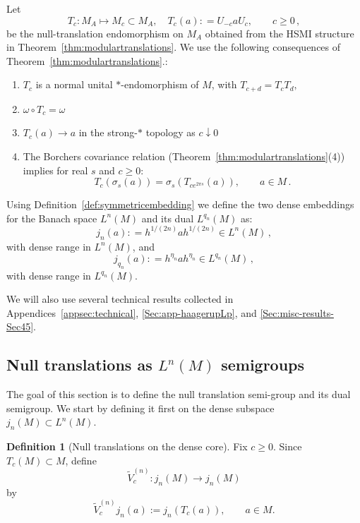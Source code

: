 \documentclass[11pt,a4paper]{article}
\theoremstyle{plain}
\numberwithin{theorem}{section}
\theoremstyle{definition}
\newtheorem{definition}[theorem]{Definition}
\newcommand{\?}{\overset{?}{=}}
\newcommand{\defeq}{\mathrel{\mathop:}=}
\begin{document}
Let
\begin{equation}\label{eq:def-Tc}
  T_c: M_A\mapsto M_c \subset M_A, \quad T_c(a)\defeq U_{-c}aU_c,\qquad c\geq 0\,, 
\end{equation}
be the null-translation endomorphism on $M_A$ obtained from the HSMI structure in Theorem~\ref{thm:modulartranslations}. 
We use the following consequences of Theorem~\ref{thm:modulartranslations}.:
\begin{enumerate}
    \item $T_c$ is a normal unital $*$-endomorphism of $M$, with
            \(
                T_{c+d}=T_cT_d,
            \)
    \item \(\omega\circ T_c=\omega\)
    \item  \(T_c(a)\to a\) in the strong-\(*\) topology as \(c\downarrow0\)
    \item The Borchers covariance relation (Theorem~\ref{thm:modulartranslations}(4)) implies for real $s$ and $c\geq 0$:
            \[
                 T_c(\sigma_s(a))=\sigma_s(T_{ce^{2\pi s}}(a)),\qquad a\in M\,.
            \]
\end{enumerate}

Using Definition~\ref{def:symmetricembedding} we define the two dense embeddings for the Banach space $L^n(M)$ and its dual $L^{q_n}(M)$ as:
\begin{equation}\label{eq:jn-symmetric-embedding}
  j_n(a)\defeq h^{1/(2n)}ah^{1/(2n)}\in L^n(M)\,,
\end{equation}
with dense range in $L^n(M)$, and
\begin{equation}  j_{q_n}(a)\defeq h^{\eta_n}ah^{\eta_n}\in L^{q_n}(M)\,,
\end{equation}
with dense range in $L^{q_n}(M)$.

We will also use several technical results collected in Appendices~\ref{appsec:technical}, \ref{Sec:app-haagerupLp}, and \ref{Sec:misc-results-Sec45}.

\subsection{Null translations as \texorpdfstring{$L^n(M)$}{Ln(M)} semigroups}
\label{subsec:test-and-dual-semigroups}

The goal of this section is to define the null translation semi-group and its dual semigroup. We start by defining it first on the dense subspace $j_n(M)\subset L^{n}(M)$. 
\begin{definition}[Null translations on the dense core]
\label{def:Vc-def-dense}
Fix \(c\geq0\).  Since \(T_c(M)\subset M\), define
\[
        \widetilde V_c^{(n)}:j_n(M)\longrightarrow j_n(M)
\]
by
\begin{equation}
\label{eq:Vc-defn}
        \widetilde V_c^{(n)}j_n(a)
        :=
        j_n(T_c(a)),
        \qquad a\in M.
\end{equation}
\end{definition}
\end{document}
